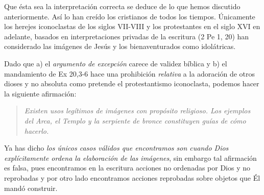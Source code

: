 \documentclass{article}
\begin{document}
Que \'esta sea la interpretaci\'on correcta se deduce de lo que hemos discutido anteriormente. As\'{i} lo han cre\'{i}do los cristianos de todos los tiempos. \'Unicamente los herejes iconoclastas de los siglos VII-VIII y los protestantes en el siglo XVI en adelante, basados en interpretaciones privadas de la escritura (2 Pe 1, 20) han considerado las im\'agenes de Jes\'us y los bienaventurados como idol\'atricas.

Dado que a) el \emph{argumento de excepci\'on} carece de validez b\'{i}blica y b) el mandamiento de Ex 20,3-6 hace una prohibici\'on \emph{relativa} a la adoraci\'on de otros dioses y no absoluta como pretende el protestantismo iconoclasta, podemos hacer la siguiente afirmaci\'on:

\begin{quote}
\emph{Existen usos leg\'itimos de im\'agenes con prop\'osito religioso. Los ejemplos del Arca, el Templo y la serpiente de bronce constituyen gu\'{i}as de c\'omo hacerlo.}
\end{quote}

\noindent
Ya has dicho \emph{los \'unicos casos v\'alidos que encontramos son cuando Dios expl\'{i}citamente ordena la elaboraci\'on de las im\'agenes}, sin embargo tal afirmaci\'on es falsa, pues encontramos en la escritura acciones no ordenadas por Dios y no reprobadas y por otro lado encontramos acciones reprobadas sobre objetos que \'El mand\'o construir.
\end{document}
